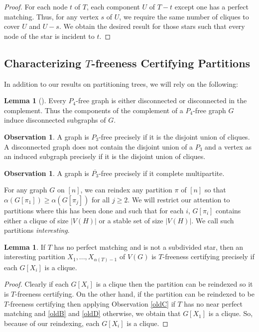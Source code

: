 \documentclass[12pt]{article}
\theoremstyle{definition}
\newtheorem{lemma}[theorem]{Lemma}
\newtheorem{observation}[theorem]{\textbf{Observation}}
\begin{document}
\begin{proof}
For each node $t $ of $T$, each component $U$ of $T-t$ except one has a perfect matching. 
Thus, for any vertex $s$ of $U$, we require the same number of  cliques  to cover $U$ and $U-s$. We obtain the desired result for those stars such that every node of the star is incident to $t$. 
\end{proof}


\subsection{Characterizing $T$-freeness Certifying Partitions}


In addition to our results on partitioning trees, we will  rely on the following: 

\begin{lemma}[\cite{S74}]
Every $P_4$-free graph is either disconnected or disconnected in the complement.
Thus the components of the complement of a $P_4$-free graph $G$ induce disconnected subgraphs of $G$. 
\end{lemma}

\begin{observation}
A graph is $P_3$-free precisely if it is the disjoint union of cliques. 
A disconnected graph does not contain the disjoint union of a $P_3$ and a vertex as an induced subgraph 
 precisely if it is the disjoint union of cliques.
\end{observation}

\begin{observation}
A graph is $\overline{P_3}$-free precisely if it complete multipartite.
\end{observation}

For any graph $G$ on $[n]$,  we can reindex any partition  $\pi$ of $[n]$
so that $\alpha(G[\pi_1]) \ge \alpha(G[\pi_j])$ for all $j \ge 2$. 
We will restrict our attention to partitions where  this has been done and such that for each $i$, 
$G[\pi_i]$ contains either a clique of size $|V(H)|$ or a stable set of size $|V(H)|$.
We call such partitions {\it interesting}. 

\begin{lemma} \label{npmnss}
If  $T$ has no  perfect matching and  is not a subdivided star, then an interesting   partition $X_1,...,X_{\alpha(T)-1}$  of $V(G)$ is $T$-freeness certifying precisely if  each $G[X_i]$ is a clique. 
\end{lemma}

\begin{proof}
Clearly if each $G[X_i]$ is a clique then the partition can be reindexed so it is  $T$-freeness certifying. On the other hand, 
if the partition can be reindexed to be  $T$-freeness certifying then applying Observation \ref{oldC} if $T$ has no near perfect matching and \ref{oldB} and \ref{oldD} otherwise, we obtain that $G[X_1]$ is a clique. So, because of our reindexing, each $G[X_i]$ is a clique. 
\end{proof}
\end{document}
